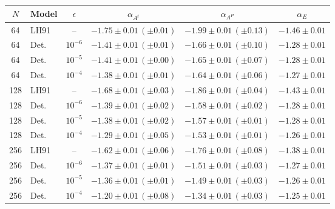 \begin{tabular}{|c|l|c|c|c|c|}
\hline
\rowcolor[HTML]{C0C0C0}
$N$ & Model & $\epsilon$ & $\alpha_{A^{t}}$ & $\alpha_{A^{P}}$ & $\alpha_{E}$ \\ \hline
64 & LH91 & -- & $-1.75\pm0.01\,(\pm0.01)$ & $-1.99\pm0.01\,(\pm0.13)$ & $-1.46\pm0.01$ \\
64 & Det. & $10^{-6}$ & $-1.41\pm0.01\,(\pm0.01)$ & $-1.66\pm0.01\,(\pm0.10)$ & $-1.28\pm0.01$ \\
64 & Det. & $10^{-5}$ & $-1.41\pm0.01\,(\pm0.00)$ & $-1.65\pm0.01\,(\pm0.07)$ & $-1.28\pm0.01$ \\
64 & Det. & $10^{-4}$ & $-1.38\pm0.01\,(\pm0.01)$ & $-1.64\pm0.01\,(\pm0.06)$ & $-1.27\pm0.01$ \\
\hline
128 & LH91 & -- & $-1.68\pm0.01\,(\pm0.03)$ & $-1.86\pm0.01\,(\pm0.04)$ & $-1.43\pm0.01$ \\
128 & Det. & $10^{-6}$ & $-1.39\pm0.01\,(\pm0.02)$ & $-1.58\pm0.01\,(\pm0.02)$ & $-1.28\pm0.01$ \\
128 & Det. & $10^{-5}$ & $-1.38\pm0.01\,(\pm0.02)$ & $-1.57\pm0.01\,(\pm0.01)$ & $-1.28\pm0.01$ \\
128 & Det. & $10^{-4}$ & $-1.29\pm0.01\,(\pm0.05)$ & $-1.53\pm0.01\,(\pm0.01)$ & $-1.26\pm0.01$ \\
\hline
256 & LH91 & -- & $-1.62\pm0.01\,(\pm0.06)$ & $-1.76\pm0.01\,(\pm0.08)$ & $-1.38\pm0.01$ \\
256 & Det. & $10^{-6}$ & $-1.37\pm0.01\,(\pm0.01)$ & $-1.51\pm0.01\,(\pm0.03)$ & $-1.27\pm0.01$ \\
256 & Det. & $10^{-5}$ & $-1.36\pm0.01\,(\pm0.01)$ & $-1.49\pm0.01\,(\pm0.03)$ & $-1.26\pm0.01$ \\
256 & Det. & $10^{-4}$ & $-1.20\pm0.01\,(\pm0.08)$ & $-1.34\pm0.01\,(\pm0.03)$ & $-1.25\pm0.01$ \\
\hline
\end{tabular}
